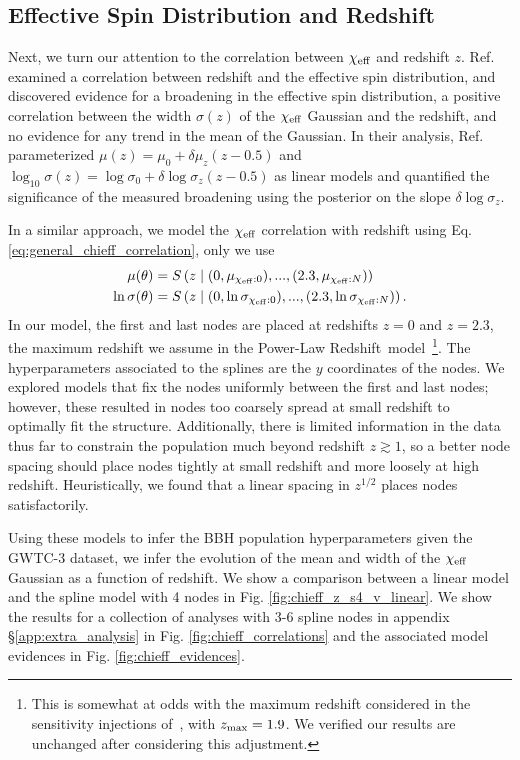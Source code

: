 \documentclass[%
 reprint,
 amsmath,amssymb,
 aps,
 prd,
]{revtex4-2}
\newcommand{\chieff}{\chi_{\rm eff}}
\newcommand{\nn}{\nonumber}
\newcommand{\pr}{{\sc Power-Law Redshift}}
\begin{document}
\subsection{Effective Spin Distribution and Redshift}

Next, we turn our attention to the correlation between $\chieff$ and redshift $z$. Ref.~\cite{Biscoveanu:2022qac} 
examined a correlation between redshift and the effective spin distribution, and discovered evidence for a broadening in the effective spin distribution, a positive correlation between the width $\sigma(z)$ of the $\chieff$ Gaussian and the redshift, and no evidence for any trend in the mean of the Gaussian. In their analysis, Ref.~\cite{Biscoveanu:2022qac} parameterized $\mu(z) = \mu_0 + \delta\mu_z (z-0.5)$ and $\log_{10}\sigma(z) = \log\sigma_0 + \delta\log\sigma_z (z-0.5)$ as linear models and quantified the significance of the measured broadening using the posterior on the slope $\delta\log\sigma_z$.

In a similar approach, we model the $\chieff$ correlation with redshift using Eq. \ref{eq:general_chieff_correlation}, only we use 
\begin{align}
\mu(\theta) &= S\left(z\;|\;(0,\mu_{\chieff:0}), ..., (2.3,\mu_{\chieff:N})\right) \nn \\
\ln \sigma(\theta) &= S\left(z\;|\; (0,\ln \sigma_{\chieff:0}), ..., (2.3,\ln \sigma_{\chieff:N})\right).
\label{eq:chieff_z_spline}
\end{align}
In our model, the first and last nodes are placed at redshifts $z=0$ and $z=2.3$, the maximum redshift we assume in the \pr~model~\footnote{This is somewhat at odds with the maximum redshift considered in the sensitivity injections of~\cite{ligo_scientific_collaboration_and_virgo_2023_7890398}, with $z_{\rm max} = 1.9$. We verified our results are unchanged after considering this adjustment.}. The hyperparameters associated to the splines are the $y$ coordinates of the nodes. We explored models that fix the nodes uniformly between the first and last nodes; however, these resulted in nodes too coarsely spread at small redshift to optimally fit the structure. Additionally, there is limited information in the data thus far to constrain the population much beyond redshift $z \gtrsim 1$, so a better node spacing should place nodes tightly at small redshift and more loosely at high redshift. Heuristically, we found that a linear spacing in $z^{1/2}$ places nodes satisfactorily. 

Using these models to infer the BBH population hyperparameters given the \ac{GWTC-3} dataset, we infer the evolution of the mean and width of the $\chieff$ Gaussian as a function of redshift. We show a comparison between a linear model and the spline model with 4 nodes in Fig. \ref{fig:chieff_z_s4_v_linear}. We show the results for a collection of analyses with 3-6 spline nodes in appendix \S \ref{app:extra_analysis} in Fig. \ref{fig:chieff_correlations} and the associated model evidences in Fig. \ref{fig:chieff_evidences}.
\end{document}
